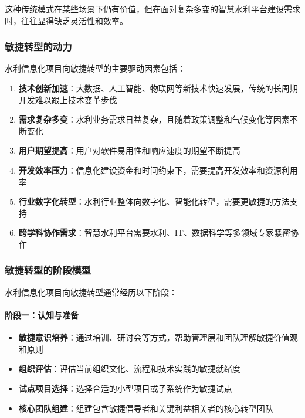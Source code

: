 这种传统模式在某些场景下仍有价值，但在面对复杂多变的智慧水利平台建设需求时，往往显得缺乏灵活性和效率。

\subsubsection{敏捷转型的动力}\label{ux654fux6377ux8f6cux578bux7684ux52a8ux529b}

水利信息化项目向敏捷转型的主要驱动因素包括：

\begin{enumerate}
\def\labelenumi{\arabic{enumi}.}
\tightlist
\item
  \textbf{技术创新加速}：大数据、人工智能、物联网等新技术快速发展，传统的长周期开发难以跟上技术变革步伐
\item
  \textbf{需求复杂多变}：水利业务需求日益复杂，且随着政策调整和气候变化等因素不断变化
\item
  \textbf{用户期望提高}：用户对软件易用性和响应速度的期望不断提高
\item
  \textbf{开发效率压力}：信息化建设资金和时间约束下，需要提高开发效率和资源利用率
\item
  \textbf{行业数字化转型}：水利行业整体向数字化、智能化转型，需要更敏捷的方法支持
\item
  \textbf{跨学科协作需求}：智慧水利平台需要水利、IT、数据科学等多领域专家紧密协作
\end{enumerate}

\subsubsection{敏捷转型的阶段模型}\label{ux654fux6377ux8f6cux578bux7684ux9636ux6bb5ux6a21ux578b}

水利信息化项目向敏捷转型通常经历以下阶段：

\paragraph{阶段一：认知与准备}\label{ux9636ux6bb5ux4e00ux8ba4ux77e5ux4e0eux51c6ux5907}

\begin{itemize}
\tightlist
\item
  \textbf{敏捷意识培养}：通过培训、研讨会等方式，帮助管理层和团队理解敏捷价值观和原则
\item
  \textbf{组织评估}：评估当前组织文化、流程和技术实践的敏捷就绪度
\item
  \textbf{试点项目选择}：选择合适的小型项目或子系统作为敏捷试点
\item
  \textbf{核心团队组建}：组建包含敏捷倡导者和关键利益相关者的核心转型团队
\end{itemize}

